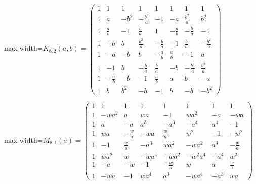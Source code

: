 \documentclass[11pt,a4paper]{article}
\theoremstyle{plain}
\theoremstyle{definition}
\numberwithin{equation}{section}
\begin{document}
\begin{center}\normalsize\setlength{\arraycolsep}{3.8pt}
\begin{adjustbox}{max width=\textwidth}$\displaystyle K_{8,2}(a,b)=\begin{pmatrix}
1 & 1 & 1 & 1 & 1 & 1 & 1 & 1 \\
1 & a & -b^{2} & -\frac{b^{2}}{a} & -1 & -a & \frac{b^{2}}{a} & b^{2} \\
1 & \frac{a}{b} & -1 & \frac{b}{a} & 1 & -\frac{a}{b} & -\frac{b}{a} & -1 \\
1 & -b & b & \frac{b^{2}}{a} & -\frac{b}{a} & -1 & \frac{b}{a} & -\frac{b^{2}}{a} \\
1 & -a & -b & b & -\frac{a}{b} & \frac{a}{b} & -1 & a \\
1 & -1 & b & -\frac{b}{a} & \frac{b}{a} & -b & -\frac{b^{2}}{a} & \frac{b^{2}}{a} \\
1 & -\frac{a}{b} & -b & -1 & \frac{a}{b} & a & b & -a \\
1 & b & b^{2} & -b & -1 & b & -b & -b^{2}
\end{pmatrix}$\end{adjustbox}
\end{center}

\begin{center}\normalsize\setlength{\arraycolsep}{3.8pt}
\begin{adjustbox}{max width=\textwidth}$\displaystyle M_{8,1}(a)=\begin{pmatrix}
1 & 1 & 1 & 1 & 1 & 1 & 1 & 1 \\
1 & -wa^{2} & a & wa & -1 & wa^{2} & -a & -wa \\
1 & a & -a & a^{3} & -a^{3} & -a^{4} & a^{4} & -1 \\
1 & wa & -\frac{w}{a} & -wa & \frac{w}{a} & w^2 & -1 & -w^2 \\
1 & -1 & \frac{w}{a} & -a^{3} & wa^{2} & -wa^{2} & a^{3} & -\frac{w}{a} \\
1 & wa^{2} & w & -wa^{4} & -wa^{2} & -w^2a^{4} & -a^{4} & w^2 \\
1 & -a & -w & -1 & -\frac{w}{a} & w & a & \frac{w}{a} \\
1 & -wa & -1 & wa^{4} & a^{3} & -wa^{4} & -a^{3} & wa
\end{pmatrix}$\end{adjustbox}
\end{center}
\end{document}
